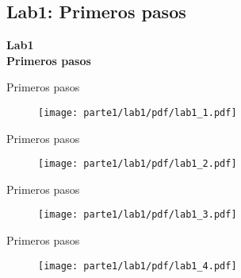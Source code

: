 \subsection{Lab1: Primeros pasos}
\begin{frame}{}


\bfseries{\textrm{\LARGE Lab1\\ \Large Primeros pasos}}
\raggedright
\end{frame}

\begin{frame}{Primeros pasos}


\begin{figure}[H]
\centering
\vspace{-3mm}
\texttt{[image: parte1/lab1/pdf/lab1\_1.pdf]}
\end{figure}
\end{frame}

\begin{frame}{Primeros pasos }
\begin{figure}[H]
\centering
\vspace{-3mm}
\texttt{[image: parte1/lab1/pdf/lab1\_2.pdf]}
\end{figure}
\end{frame}

\begin{frame}{Primeros pasos }
\begin{figure}[H]
\vspace{-3mm}
\centering
\texttt{[image: parte1/lab1/pdf/lab1\_3.pdf]}
\end{figure}
\end{frame}

\begin{frame}{Primeros pasos }
\begin{figure}[H]
\vspace{-3mm}
\centering
\texttt{[image: parte1/lab1/pdf/lab1\_4.pdf]}
\end{figure}
\end{frame}

